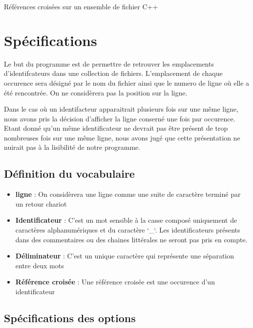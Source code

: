 \documentclass{article}
\begin{document}
\begin{center} 
\Huge{Références croisées sur un ensemble de fichier C++}
\end{center}

\section{Spécifications}
Le but du programme est de permettre de retrouver les emplacements d'identifcateurs dans une collection de fichiers. L'emplacement de chaque occurence sera désigné
par le nom du fichier ainsi que le numero de ligne où elle a été rencontrée. On ne considèrera pas la position sur la ligne.

Dans le cas où un identifacteur apparaitrait plusieurs fois sur une même ligne, nous avons pris la décision d'afficher la ligne conserné une fois par occurence. Etant donné qu'un même identificateur ne devrait pas être présent de trop nombreuses fois sur une même ligne, nous avons jugé que cette présentation ne nuirait pas à la lisibilité de notre programme.


\subsection{Définition du vocabulaire}

\begin{itemize}
\item \textbf{ligne} : On considèrera une ligne comme une suite de caractère terminé par un retour chariot

\item \textbf{Identificateur} : C'est un mot sensible à la casse composé uniquement de caractères alphanumériques et du caractère `\_`. Les identificateurs présents dans des commentaires ou des chaines littérales ne seront pas pris en compte. 

\item \textbf{Déliminateur} : C'est un unique caractère qui représente une séparation entre deux mots 

\item \textbf{Référence croisée} : Une référence croisée est une occurence d'un identificateur

\end{itemize}


\subsection{Spécifications des options}
\end{document}
